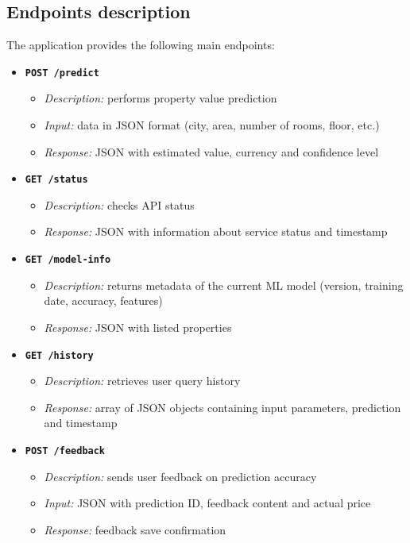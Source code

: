 \documentclass{article}
\begin{document}
\subsection{Endpoints description}

The application provides the following main endpoints:





\begin{itemize}
\item \textbf{\texttt{POST /predict}}
\begin{itemize}
\item \emph{Description:} performs property value prediction
\item \emph{Input:} data in JSON format (city, area, number of rooms, floor, etc.)
\item \emph{Response:} JSON with estimated value, currency and confidence level
\end{itemize}

\item \textbf{\texttt{GET /status}}
\begin{itemize}
\item \emph{Description:} checks API status
\item \emph{Response:} JSON with information about service status and timestamp
\end{itemize}

\item \textbf{\texttt{GET /model-info}}
\begin{itemize}
\item \emph{Description:} returns metadata of the current ML model (version, training date, accuracy, features)
\item \emph{Response:} JSON with listed properties
\end{itemize}

\item \textbf{\texttt{GET /history}}
\begin{itemize}
\item \emph{Description:} retrieves user query history
\item \emph{Response:} array of JSON objects containing input parameters, prediction and timestamp
\end{itemize}

\item \textbf{\texttt{POST /feedback}}
\begin{itemize}
\item \emph{Description:} sends user feedback on prediction accuracy
\item \emph{Input:} JSON with prediction ID, feedback content and actual price
\item \emph{Response:} feedback save confirmation
\end{itemize}


\end{itemize}
\end{document}
